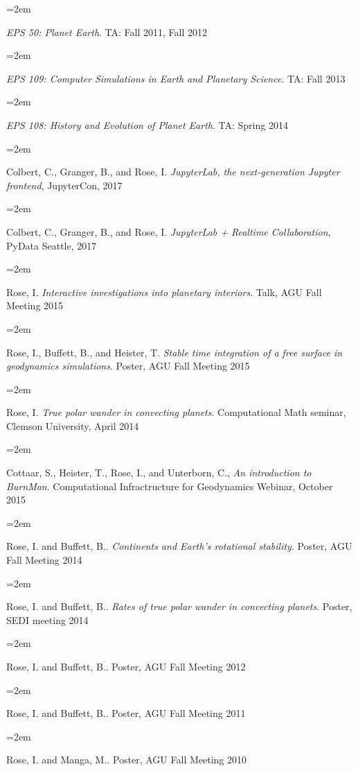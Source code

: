 \documentclass{scrartcl}
\newcommand{\Description}[1]{\hangindent=2em\hangafter=0\noindent\raggedright\footnotesize{#1}\par\normalsize\vspace{1em}} %
\begin{document}
\begin{cv}{}
\vspace{1em}

\Description{\textit{EPS 50: Planet Earth}. TA: Fall 2011, Fall 2012}

\Description{\textit{EPS 109: Computer Simulations in Earth and Planetary Science}. TA: Fall 2013}

\Description{\textit{EPS 108: History and Evolution of Planet Earth}. TA: Spring 2014}


\vspace{1em} %



\vspace{1em}


\vspace{1em} %

\Description{Colbert, C., Granger, B., and Rose, I. \textit{JupyterLab, the next-generation Jupyter frontend}, JupyterCon, 2017}
\Description{Colbert, C., Granger, B., and Rose, I. \textit{JupyterLab + Realtime Collaboration}, PyData Seattle, 2017}
\Description{Rose, I. \textit{Interactive investigations into planetary interiors}. Talk, AGU Fall Meeting 2015}
\Description{Rose, I., Buffett, B., and Heister, T. \textit{Stable time integration of a free surface in geodynamics simulations}. Poster, AGU Fall Meeting 2015}
\Description{Rose, I. \textit{True polar wander in convecting planets}. Computational Math seminar, Clemson University, April 2014}
\Description{Cottaar, S., Heister, T., Rose, I., and Unterborn, C., \textit{An introduction to BurnMan}. Computational Infractructure for Geodynamics Webinar, October 2015}
\Description{Rose, I. and Buffett, B.. \textit{Continents and Earth's rotational stability}. Poster, AGU Fall Meeting 2014}
\Description{Rose, I. and Buffett, B.. \textit{Rates of true polar wander in convecting planets}. Poster, SEDI meeting 2014}
\Description{Rose, I. and Buffett, B.. \textit{} Poster, AGU Fall Meeting 2012}
\Description{Rose, I. and Buffett, B.. \textit{} Poster, AGU Fall Meeting 2011}
\Description{Rose, I. and Manga, M.. \textit{} Poster, AGU Fall Meeting 2010}


\end{cv}
\end{document}
